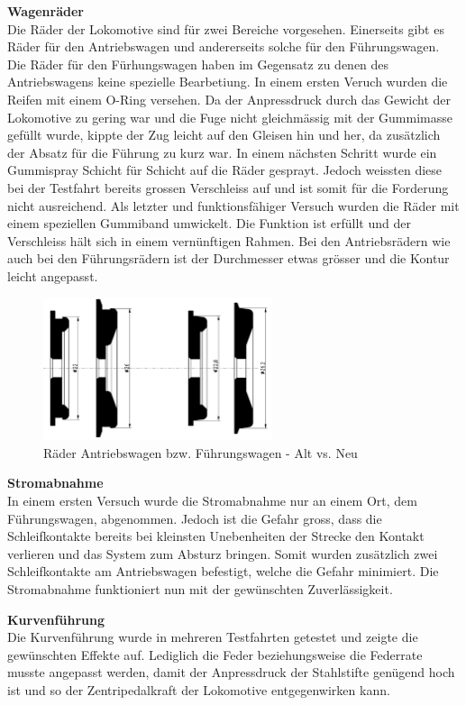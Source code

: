 \documentclass[../../main.tex]{subfiles}
\begin{document}
\textbf{Wagenräder}\\
Die Räder der Lokomotive sind für zwei Bereiche vorgesehen. Einerseits gibt es Räder für den Antriebswagen und andererseits solche für den Führungswagen. Die Räder für den Fürhungswagen haben im Gegensatz zu denen des Antriebswagens keine spezielle Bearbetiung. In einem ersten Veruch wurden die Reifen mit einem O-Ring versehen. Da der Anpressdruck durch das Gewicht der Lokomotive zu gering war und die Fuge nicht gleichmässig mit der Gummimasse gefüllt wurde, kippte der Zug leicht auf den Gleisen hin und her, da zusätzlich der Absatz für die Führung zu kurz war. In einem nächsten Schritt wurde ein Gummispray Schicht für Schicht auf die Räder gesprayt. Jedoch weissten diese bei der Testfahrt bereits grossen Verschleiss auf und ist somit für die Forderung nicht ausreichend. Als letzter und funktionsfähiger Versuch wurden die Räder mit einem speziellen Gummiband umwickelt. Die Funktion ist erfüllt und der Verschleiss hält sich in einem vernünftigen Rahmen. Bei den Antriebsrädern wie auch bei den Führungsrädern ist der Durchmesser etwas grösser und die Kontur leicht angepasst.\\

\begin{figure}[H]
  \centering
  \includegraphics[width=0.6\textwidth]{wagenraeder.PNG}
  \caption {Räder Antriebswagen bzw. Führungswagen - Alt vs. Neu}
  \label{fig:raeder}
\end{figure}

\pagebreak

\textbf{Stromabnahme}\\
In einem ersten Versuch wurde die Stromabnahme nur an einem Ort, dem Führungswagen, abgenommen. Jedoch ist die Gefahr gross, dass die Schleifkontakte bereits bei kleinsten Unebenheiten der Strecke den Kontakt verlieren und das System zum Absturz bringen. Somit wurden zusätzlich zwei Schleifkontakte am Antriebswagen befestigt, welche die Gefahr minimiert. Die Stromabnahme funktioniert nun mit der gewünschten Zuverlässigkeit.

\textbf{Kurvenführung}\\
Die Kurvenführung wurde in mehreren Testfahrten getestet und zeigte die gewünschten Effekte auf. Lediglich die Feder beziehungsweise die Federrate musste angepasst werden, damit der Anpressdruck der Stahlstifte genügend hoch ist und so der Zentripedalkraft der Lokomotive entgegenwirken kann.
\end{document}
